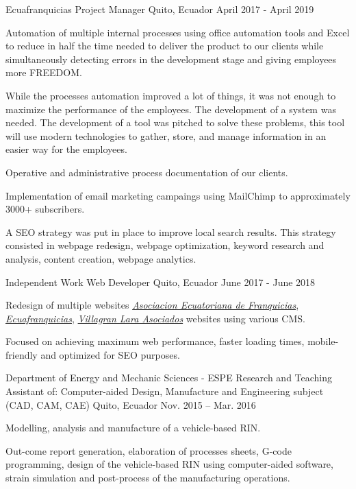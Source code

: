 
\begin{cventries}

  \cventry
    {Ecuafranquicias}
    {Project Manager}
    {Quito, Ecuador}
    {April 2017 - April 2019}
    {
      \begin{cvitems}
        \item {Automation of multiple internal processes using office automation tools and Excel to reduce in half the time needed to deliver the product to our clients while simultaneously detecting errors in the development stage and giving employees more FREEDOM.}
        \item {While the processes automation improved a lot of things, it was not enough to maximize the performance of the employees. The development of a system was needed. The development of a tool was pitched to solve these problems, this tool will use modern technologies to gather, store, and manage information in an easier way for the employees.}
        \item {Operative and administrative process documentation of our clients.}
        \item {Implementation of email marketing campaings using MailChimp to approximately 3000+ subscribers.}
        \item {A SEO strategy was put in place to improve local search results. This strategy consisted in webpage redesign, webpage optimization, keyword research and analysis, content creation, webpage analytics.}
      \end{cvitems}
    }

    \cventry
      {Independent Work}
      {Web Developer}
      {Quito, Ecuador}
      {June 2017 - June 2018}
      {
        \begin{cvitems}
          \item {Redesign of multiple websites \href{https://aefran.org}{\textit{Asociacion Ecuatoriana de Franquicias}}, \href{http://www.ecuafranquicias.com}{\textit{Ecuafranquicias}}, \href{http://www.villagranlara.com}{\textit{Villagran Lara Asociados}} websites using various CMS.}
          \item {Focused on achieving maximum web performance, faster loading times, mobile-friendly and optimized for SEO purposes.}                       
        \end{cvitems} 
      }

  \cventry
    {Department of Energy and Mechanic Sciences - ESPE}
    {Research and Teaching Assistant of: Computer-aided Design, Manufacture and Engineering subject (CAD, CAM, CAE)	}
    {Quito, Ecuador}
    {Nov. 2015 – Mar. 2016}
    {
      \begin{cvitems}
        \item {Modelling, analysis and manufacture of a vehicle-based RIN.}
        \item {Out-come report generation, elaboration of processes sheets, G-code programming, design of the vehicle-based RIN using computer-aided software, strain simulation and post-process of the manufacturing operations.}
      \end{cvitems}
    }
  

\end{cventries}
